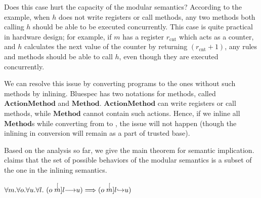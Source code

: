 Does this case hurt the capacity of the modular semantics? According
to the example, when $h$ does not write registers or call methods, any
two methods both calling $h$ should be able to be executed
concurrently. This case is quite practical in hardware design; for
example, if $m$ has a register $r_{\textrm{cnt}}$ which acts as a
counter, and $h$ calculates the next value of the counter by returning
$(r_{\textrm{cnt}} + 1)$, any rules and methods should be able to call
$h$, even though they are executed concurrently.

We can resolve this issue by converting programs to the ones without
such methods by inlining. Bluespec has two notations for methods,
called $\textbf{ActionMethod}$ and
$\textbf{Method}$. $\textbf{ActionMethod}$ can write registers or call
methods, while $\textbf{Method}$ cannot contain such actions. Hence,
if we inline all $\textbf{Method}$s while converting from \Bluespec{}
to \Kami{}, the issue will not happen (though the inlining in
conversion will remain as a part of trusted base).


Based on the analysis so far, we give the main theorem for semantic
implication.  claims that the set of possible
behaviors of the modular semantics is a subset of the one in the
inlining semantics.

\begin{theorem}
  \label{thm-modtoinl}
  \mbox{}
  \begin{center}
    \begin{math}
      \forall m.\forall o.\forall u.\forall l.\ 
      (\semstep{m}{o}{u}{l}) \Longrightarrow (\semstepin{m}{o}{u}{l})
    \end{math}
  \end{center}
\end{theorem}


